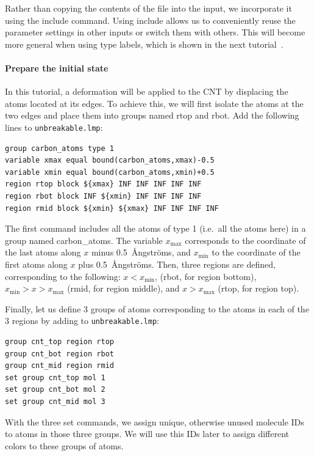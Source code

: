 \documentclass[9pt,tutorial]{livecoms}
\newcommand{\lmpcmd}[1]{\hspace{0pt}\colorbox{listing}{\textcolor{command}{\small{#1}}}\hspace{0pt}} %
\newcommand{\flecmd}[1]{\textcolor{command}{\texttt{#1}}} %
\begin{document}
Rather than copying the contents of the file into the input, we
incorporate it using the \lmpcmd{include} command.  Using \lmpcmd{include} allows
us to conveniently reuse the parameter settings
in other inputs or switch them with others.  This will become more general
when using type labels, which is shown in the next
tutorial~\cite{typelabel_paper}.

\paragraph{Prepare the initial state}

In this tutorial, a deformation will be applied to the CNT by displacing
the atoms located at its edges.  To achieve this, we will first isolate the
atoms at the two edges and place them into groups named \lmpcmd{rtop} and
\lmpcmd{rbot}.  Add the following lines to \flecmd{unbreakable.lmp}:
\begin{lstlisting}
group carbon_atoms type 1
variable xmax equal bound(carbon_atoms,xmax)-0.5
variable xmin equal bound(carbon_atoms,xmin)+0.5
region rtop block ${xmax} INF INF INF INF INF
region rbot block INF ${xmin} INF INF INF INF
region rmid block ${xmin} ${xmax} INF INF INF INF
\end{lstlisting}
The first command includes all the atoms of type 1 (i.e.~all the atoms here)
in a group named \lmpcmd{carbon\_atoms}.
The variable $x_\text{max}$ corresponds to the coordinate of the
last atoms along $x$ minus 0.5~Ångströms, and $x_\text{min}$ to the coordinate
of the first atoms along $x$ plus 0.5~Ångströms.  Then, three regions are defined,
corresponding to the following: $x < x_\text{min}$, (\lmpcmd{rbot}, for region
bottom), $x_\text{min} > x > x_\text{max}$ (\lmpcmd{rmid}, for region middle),
and $x > x_\text{max}$ (\lmpcmd{rtop}, for region top).

Finally, let us define 3 groups of atoms corresponding to the atoms
in each of the 3 regions by adding to \flecmd{unbreakable.lmp}:
\begin{lstlisting}
group cnt_top region rtop
group cnt_bot region rbot
group cnt_mid region rmid
set group cnt_top mol 1
set group cnt_bot mol 2
set group cnt_mid mol 3
\end{lstlisting}
With the three \lmpcmd{set} commands, we assign unique, otherwise unused
molecule IDs to atoms in those three groups.  We will use this IDs later to
assign different colors to these groups of atoms.
\end{document}
